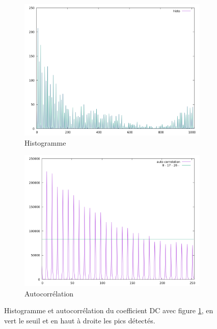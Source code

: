 \documentclass[utf8,final]{stageM2R} %
\begin{document}
\begin{figure}
  \begin{subfigure}{.5\textwidth}
    \centering
    \includegraphics[width=\linewidth]{images/histos/histo0}
    \caption{Histogramme}
  \end{subfigure}
  \begin{subfigure}{.5\textwidth}
    \centering
    \includegraphics[width=\linewidth]{images/histos/autocorrelation0}
    \caption{Autocorrélation}
    \label{fig:histo0_auto}
  \end{subfigure}
  \caption{Histogramme et autocorrélation du coefficient DC avec figure \ref{fig:histo0_auto}, en vert le seuil et en haut à droite les pics détectés.}
  \label{fig:histo0}
\end{figure}
\end{document}
